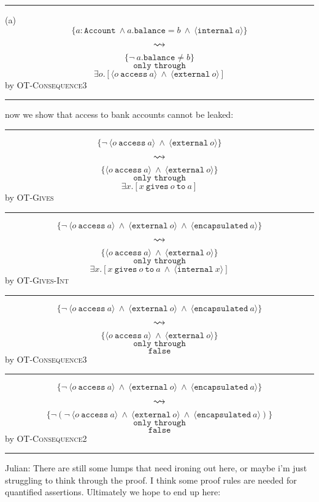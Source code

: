 \documentclass[12pt]{article}
\newcommand\trans[1]{\overset{#1}{\mathlarger{\mathlarger \leadsto}}}
\newcommand\gives[3]{#1\ \texttt{gives}\ #2\ \texttt{to}\ #3}
\begin{document}
\hrule
\vspace{3mm}
(a)
$$
	\{a : \texttt{Account}\ \wedge a.\texttt{balance} = b\ \wedge\  \langle \texttt{internal}\ a \rangle\}
$$
$$\trans{}$$
$$
	\{\neg\ a.\texttt{balance} \neq b\}
$$
$$\texttt{only through}$$
$$
	{\exists o.[\langle o\ \texttt{access}\ a\rangle\ \wedge\ \langle \texttt{external}\ o \rangle]}
$$
\hfill by \textsc{OT-Consequence3}
\hrule
\vspace{3mm}
\normalsize
\noindent now we show that access to bank accounts cannot be leaked:
\vspace{3mm}
\footnotesize
\hrule
\vspace{3mm}
$$
	\{\neg\ \langle o\ \texttt{access}\ a\rangle\ \wedge\ \langle \texttt{external}\ o \rangle\}
$$
$$\trans{}$$
$$
	\{\langle o\ \texttt{access}\ a\rangle\ \wedge\ \langle \texttt{external}\ o \rangle\}
$$
$$\texttt{only through}$$
$$
	\exists x.[\gives{x}{o}{a}]
$$
\hfill by \textsc{OT-Gives}
\hrule
\vspace{3mm}
$$
	\{\neg\ \langle o\ \texttt{access}\ a\rangle\ \wedge\ \langle \texttt{external}\ o \rangle\ \wedge\ \langle \texttt{encapsulated}\ a\rangle\}
$$
$$\trans{}$$
$$
	\{\langle o\ \texttt{access}\ a\rangle\ \wedge\ \langle \texttt{external}\ o \rangle\}
$$
$$\texttt{only through}$$
$$
	\exists x.[\gives{x}{o}{a}\ \wedge\ \langle \texttt{internal}\ x\rangle]
$$
\hfill by \textsc{OT-Gives-Int}
\hrule
\vspace{3mm}
$$
	\{\neg\ \langle o\ \texttt{access}\ a\rangle\ \wedge\ \langle \texttt{external}\ o \rangle\ \wedge\ \langle \texttt{encapsulated}\ a\rangle\}
$$
$$\trans{}$$
$$
	\{\langle o\ \texttt{access}\ a\rangle\ \wedge\ \langle \texttt{external}\ o \rangle\}
$$
$$\texttt{only through}$$
$$
	\texttt{false}
$$
\hfill by \textsc{OT-Consequence3}
\hrule
\vspace{3mm}
$$
	\{\neg\ \langle o\ \texttt{access}\ a\rangle\ \wedge\ \langle \texttt{external}\ o \rangle\ \wedge\ \langle \texttt{encapsulated}\ a\rangle\}
$$
$$\trans{}$$
$$
	\{\neg(\neg\ \langle o\ \texttt{access}\ a\rangle\ \wedge\ \langle \texttt{external}\ o \rangle\ \wedge\ \langle \texttt{encapsulated}\ a\rangle)\}
$$
$$\texttt{only through}$$
$$
	\texttt{false}
$$
\hfill by \textsc{OT-Consequence2}
\hrule
\vspace{3mm}
\normalsize
{\noindent\color{red} Julian: There are still some lumps that need ironing out here, or maybe i'm just struggling to think through the proof.
I think some proof rules are needed for quantified assertions.
Ultimately we hope to end up here:}
\vspace{3mm}
\end{document}
